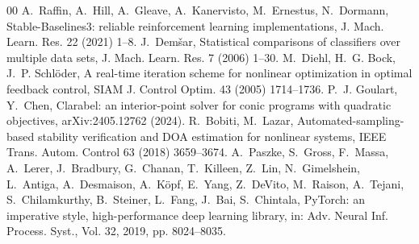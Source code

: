 \begin{thebibliography}{00}
 A.~Raffin, A.~Hill, A.~Gleave, A.~Kanervisto, M.~Ernestus, N.~Dormann, Stable-Baselines3: reliable reinforcement learning implementations, J. Mach. Learn. Res. 22 (2021) 1--8.
 J.~Dem\v{s}ar, Statistical comparisons of classifiers over multiple data sets, J. Mach. Learn. Res. 7 (2006) 1--30.
 M.~Diehl, H.~G. Bock, J.~P. Schl\"oder, A real-time iteration scheme for nonlinear optimization in optimal feedback control, SIAM J. Control Optim. 43 (2005) 1714--1736.
 P.~J. Goulart, Y.~Chen, Clarabel: an interior-point solver for conic programs with quadratic objectives, arXiv:2405.12762 (2024).
 R.~Bobiti, M.~Lazar, Automated-sampling-based stability verification and DOA estimation for nonlinear systems, IEEE Trans. Autom. Control 63 (2018) 3659--3674.
 A.~Paszke, S.~Gross, F.~Massa, A.~Lerer, J.~Bradbury, G.~Chanan, T.~Killeen, Z.~Lin, N.~Gimelshein, L.~Antiga, A.~Desmaison, A.~K\"opf, E.~Yang, Z.~DeVito, M.~Raison, A.~Tejani, S.~Chilamkurthy, B.~Steiner, L.~Fang, J.~Bai, S.~Chintala, PyTorch: an imperative style, high-performance deep learning library, in: Adv. Neural Inf. Process. Syst., Vol. 32, 2019, pp. 8024--8035.
\end{thebibliography}
